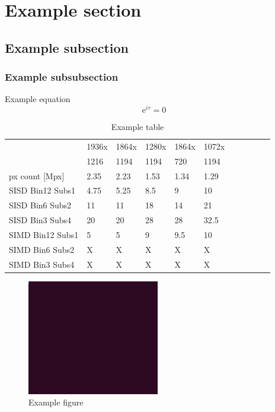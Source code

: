 \documentclass[11pt]{article}
\begin{document}
\section{Example section}
\subsection{Example subsection}
\subsubsection{Example subsubsection}

Example equation
\begin{equation}
    \mathrm{e}^{i\tau} = 0
\end{equation}


\begin{table}[ht]
    \centering
    \begin{tabular}{|l|l|l|l|l|l|l|l|l|l|l|}
        \hline
         & \textsf{1936x} & \textsf{1864x} & \textsf{1280x} & \textsf{1864x} & \textsf{1072x} \\
         & \textsf{1216}  & \textsf{1194}  & \textsf{1194}  & \textsf{720}   & \textsf{1194}  \\
        \hline
        px count [Mpx] & 2.35 & 2.23 & 1.53 & 1.34 & 1.29 \\
        \hline
        \hline
        \hline
        SISD Bin12 Subs1 & 4.75  & 5.25  & 8.5   & 9     & 10    \\ \hline
        SISD Bin6 Subs2  & 11    & 11    & 18    & 14    & 21    \\ \hline
        SISD Bin3 Subs4  & 20    & 20    & 28    & 28    & 32.5  \\
        \hline                                                                 
        \hline                                                                 
        SIMD Bin12 Subs1 & 5     & 5     & 9     & 9.5   & 10    \\ \hline
        SIMD Bin6 Subs2  & X     & X     & X     & X     & X     \\ \hline
        SIMD Bin3 Subs4  & X     & X     & X     & X     & X     \\ \hline
    \end{tabular}
    \caption{Example table}
\end{table}

\begin{figure}[htb]
    \centering
    \includegraphics[width=.35\linewidth]{example-image.png}
    \caption{Example figure}
    \label{fig:fig}
\end{figure}
\end{document}
